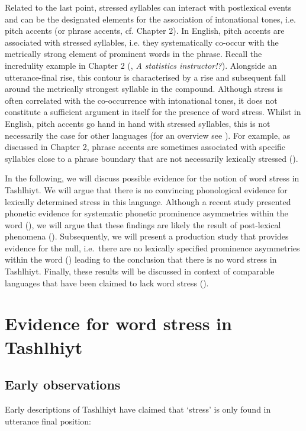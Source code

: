 Related to the last point, stressed syllables can interact with postlexical events and can be the designated elements for the association of intonational tones, i.e. pitch accents (or phrase accents, cf. Chapter 2). In English, pitch accents are associated with stressed syllables, i.e. they systematically co-occur with the metrically strong element of prominent words in the phrase. Recall the incredulity example in Chapter 2 (, \textit{A statistics instructor!?}). Alongside an utterance-final rise, this contour is characterised by a rise and subsequent fall around the metrically strongest syllable in the compound. Although stress is often correlated with the co-occurrence with intonational tones, it does not constitute a sufficient argument in itself for the presence of word stress. Whilst in English, pitch accents go hand in hand with stressed syllables, this is not necessarily the case for other languages (for an overview see \citealt{Gordon2014}). For example, as discussed in Chapter 2, phrase accents are sometimes associated with specific syllables close to a phrase boundary that are not necessarily lexically stressed (\citealt{Grice.etal2000}).

In the following, we will discuss possible evidence for the notion of word stress in Tashlhiyt. We will argue that there is no convincing phonological evidence for lexically determined stress in this language. Although a recent study presented phonetic evidence for systematic phonetic prominence asymmetries within the word (\citealt{GordonNafi2012}), we will argue that these findings are likely the result of post-lexical phenomena (). Subsequently, we will present a production study that provides evidence for the null, i.e.\ there are no lexically specified prominence asymmetries within the word () leading to the conclusion that there is no word stress in Tashlhiyt. Finally, these results will be discussed in context of comparable languages that have been claimed to lack word stress ().

\section{Evidence for word stress in Tashlhiyt}\label{sec:4.2}
\subsection{Early observations}
Early descriptions of Tashlhiyt have claimed that ‘stress’ is only found in utterance final position:

